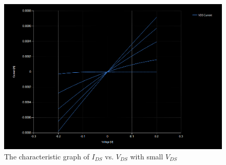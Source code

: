 \begin{figure}[ht]
    \centering
    \includegraphics[width=.95\linewidth]{figures/ECE331_Lab3_Data422V1.png}
    \caption{The characteristic graph of $I_{DS}$ vs. $V_{DS}$ with small $V_{DS}$}
    \label{fig:characteristic_small}
\end{figure}